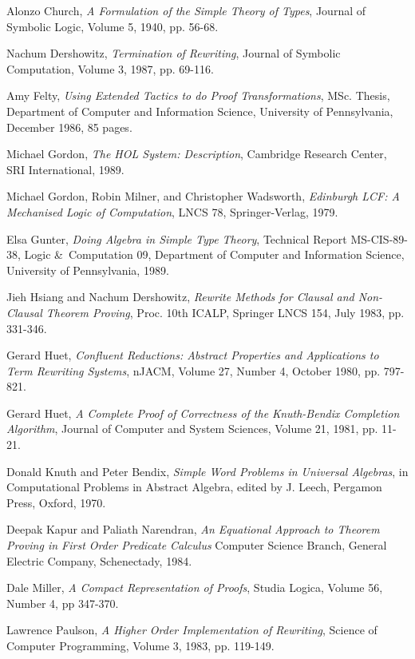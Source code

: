 \begin{thebibliography}{Therearemanygoats}

Alonzo Church,
{\it A Formulation of the Simple Theory of Types},
Journal of Symbolic Logic,
Volume 5,
1940,
pp. 56-68.

Nachum Dershowitz,
{\it Termination of Rewriting},
Journal of Symbolic Computation,
Volume 3,
1987,
pp. 69-116.

Amy Felty,
{\it Using Extended Tactics to do Proof Transformations},
MSc. Thesis,
Department of Computer and Information Science,
University of Pennsylvania,
December 1986,
85 pages.

Michael Gordon,
{\it The HOL System: Description},
Cambridge Research Center, SRI International,
1989.

Michael Gordon, Robin Milner, and Christopher Wadsworth,
{\it Edinburgh LCF: A Mechanised Logic of Computation},
LNCS 78,
Springer-Verlag,
1979.

Elsa Gunter,
{\it Doing Algebra in Simple Type Theory},
Technical Report MS-CIS-89-38, Logic \&\ Computation 09,
Department of Computer and Information Science, 
University of Pennsylvania,
1989.

Jieh Hsiang and Nachum Dershowitz,
{\it Rewrite Methods for Clausal and Non-Clausal Theorem Proving},
Proc. 10th ICALP,
Springer LNCS 154,
July 1983,
pp. 331-346.

Gerard Huet,
{\it Confluent Reductions: Abstract Properties and Applications to Term Rewriting Systems},
nJACM,
Volume 27, Number 4,
October 1980,
pp. 797-821.

Gerard Huet,
{\it A Complete Proof of Correctness of the Knuth-Bendix Completion Algorithm},
Journal of Computer and System Sciences,
Volume 21,
1981,
pp. 11-21.

Donald Knuth and Peter Bendix,
{\it Simple Word Problems in Universal Algebras},
in Computational Problems in Abstract Algebra,
edited by J. Leech,
Pergamon Press,
Oxford,
1970.

Deepak Kapur and Paliath Narendran,
{\it An Equational Approach to Theorem Proving in First Order Predicate Calculus}
Computer Science Branch,
General Electric Company,
Schenectady,
1984.

Dale Miller,
{\it A Compact Representation of Proofs},
Studia Logica,
Volume 56, Number 4,
pp 347-370.

Lawrence Paulson,
{\it A Higher Order Implementation of Rewriting},
Science of Computer Programming,
Volume 3,
1983,
pp. 119-149.

\end{thebibliography}


